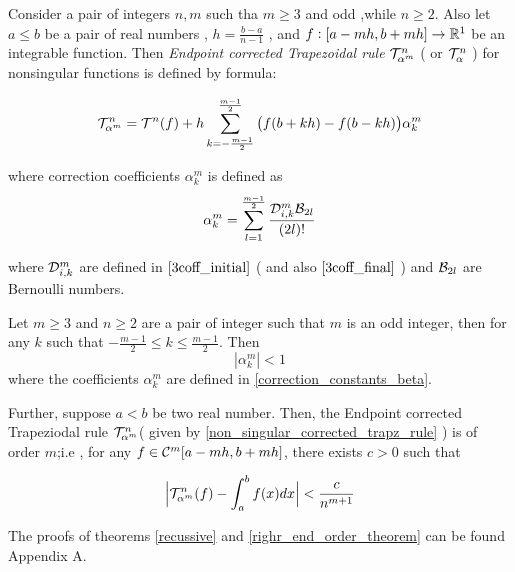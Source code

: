 \documentclass[../document.tex]{subfiles}
\begin{document}
	Consider a pair of integers $n,m$ such tha $m\geq3$ and odd ,while $n\geq2$.
	Also let $a\leq b$ be a pair of real numbers , $h = \frac{b-a}{n-1}$ , and 
	$f:[a-mh,b+mh] \rightarrow \mathbb{R}^{1}$ be an integrable function. Then \emph{Endpoint corrected Trapezoidal rule} $\mathcal{T}_{\alpha^m}^{n}$ 
	( or $\mathcal{T}_{\alpha}^{n}$ ) for nonsingular functions is defined by formula:
	
	\begin{equation}    \label{non_singular_corrected_trapz_rule}
		\mathcal{T}_{\alpha^m}^{n} = \mathcal{T}^{n}(f)  + 
		h \sum_{k = -\frac{m-1}{2}}^{\frac{m-1}{2}} 
		\big(
		f(b+kh) - f(b-kh)
		\big)		\alpha^m_k 
	\end{equation}
	
	where correction coefficients $\alpha^m_k$ is defined as 
	\begin{equation} \label{correction_constants_beta}
		\alpha^m_k = \sum_{l=1}^{\frac{m-1}{2}} 
		\frac{ \mathcal{D}_{i,k}^{m} \mathcal{B}_{2l}}{(2l)!}
	\end{equation}
	
	where $\mathcal{D}_{i,k}^{m}$ are defined in $\ref{3coff_initial}$ ( and also $\ref{3coff_final}$ ) and $\mathcal{B}_{2l}$ are Bernoulli numbers.
	
	
	\begin{theorem}   \label{righr_end_order_theorem}
		Let $m\geq 3$ and $n\geq 2$ are a pair of integer such that $m$ is an odd integer, then for any $k$ such that 
		$-\frac{m-1}{2} \leq k \leq \frac{m-1}{2}$. Then
		\begin{equation}
			|\alpha^m_k | < 1
		\end{equation}
		where the coefficients $\alpha^m_k$ are defined in \ref{correction_constants_beta}.
		
		Further, suppose $a<b$ be two real number. Then, the Endpoint corrected Trapeziodal rule $\mathcal{T}_{\alpha^m}^{n}$( given by \ref{non_singular_corrected_trapz_rule} ) is of order $m$;i.e , for any 
		$f \in \mathcal{C}^m[a-mh,b+mh]$, there exists $c>0$ such that 
		
		\begin{equation}
			\Big|
			\mathcal{T}_{\alpha^m}^{n}(f) - \int_{a}^{b} f(x)dx
			\Big|
			< \frac{c}{ n^{m+1} }
		\end{equation} 
	\end{theorem}
	
	The proofs of theorems \ref{recussive} and \ref{righr_end_order_theorem} can be found Appendix A.
	
	
	
\end{document}
